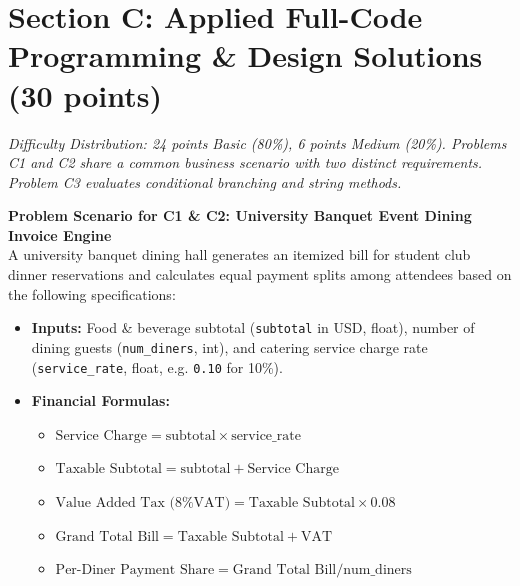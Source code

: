 \documentclass[11pt,a4paper]{article}
\begin{document}
\newpage

\section*{Section C: Applied Full-Code Programming \& Design Solutions (30 points)}
\textit{Difficulty Distribution: 24 points Basic (80\%), 6 points Medium (20\%). Problems C1 and C2 share a common business scenario with two distinct requirements. Problem C3 evaluates conditional branching and string methods.}

\begin{tcolorbox}[colback=boxbg, colframe=secondaryteal, arc=1.2mm, boxrule=0.6pt, left=2.0mm, right=2.0mm, top=0.8mm, bottom=0.8mm]
\textbf{\small Problem Scenario for C1 \& C2: University Banquet Event Dining Invoice Engine}\\[0.2mm]
\footnotesize
A university banquet dining hall generates an itemized bill for student club dinner reservations and calculates equal payment splits among attendees based on the following specifications:
\begin{itemize}[itemsep=0.1pt,topsep=0.1pt]
  \item \textbf{Inputs:} Food \& beverage subtotal (\texttt{subtotal} in USD, float), number of dining guests (\texttt{num\_diners}, int), and catering service charge rate (\texttt{service\_rate}, float, e.g. \texttt{0.10} for 10\%).
  \item \textbf{Financial Formulas:}
    \begin{itemize}[itemsep=0.1pt]
      \item $\text{Service Charge} = \text{subtotal} \times \text{service\_rate}$
      \item $\text{Taxable Subtotal} = \text{subtotal} + \text{Service Charge}$
      \item $\text{Value Added Tax (8\% VAT)} = \text{Taxable Subtotal} \times 0.08$
      \item $\text{Grand Total Bill} = \text{Taxable Subtotal} + \text{VAT}$
      \item $\text{Per-Diner Payment Share} = \text{Grand Total Bill} / \text{num\_diners}$
    \end{itemize}
\end{itemize}
\end{tcolorbox}
\end{document}
